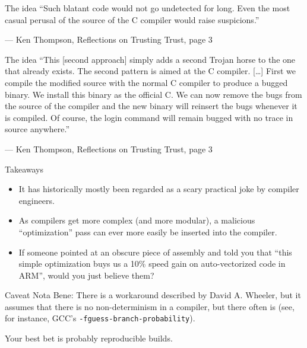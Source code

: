 \documentclass[aspectratio=169]{beamer}
\begin{document}
  \begin{frame}{The idea}
    “Such blatant code would not go undetected for long. Even the most casual
     perusal of the source of the C compiler would raise suspicions.” 

     \indent — Ken Thompson, Reflections on Trusting Trust, page 3
  \end{frame}
  \begin{frame}{The idea}
    “This [second approach] simply adds a second Trojan horse to the one that
     already exists. The second pattern is aimed at the C compiler. [\ldots] First
     we compile the modified source with the normal C compiler to produce a
     bugged binary. We install this binary as the official C. We can now remove
     the bugs from the source of the compiler and the new binary will reinsert
     the bugs whenever it is compiled. Of course, the login command will remain
     bugged with no trace in source anywhere.”

     \indent — Ken Thompson, Reflections on Trusting Trust, page 3
  \end{frame}
  \begin{frame}{Takeaways}
    \begin{itemize}
      \item It has historically mostly been regarded as a scary practical joke
            by compiler engineers.
      \item As compilers get more complex (and more modular), a malicious
            “optimization” pass can ever more easily be inserted into the
            compiler.
      \item If someone pointed at an obscure piece of assembly and told you
            that “this simple optimization buys us a 10\% speed gain on
            auto-vectorized code in ARM”, would you just believe them?
    \end{itemize}
  \end{frame}
  \begin{frame}{Caveat}
    Nota Bene: There is a workaround described by David A. Wheeler, but it
    assumes that there is no non-determinism in a compiler, but there often is
    (see, for instance, GCC’s \texttt{-fguess-branch-probability}).

    Your best bet is probably reproducible builds.
  \end{frame}
\end{document}
